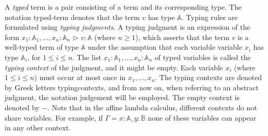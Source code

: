 A \emph{typed} term is a pair consisting of a term and its corresponding type. The notation \gls{typed-term} denotes that the term $v$ has type $\mathbb{A}$. Typing rules are formulated using \emph{typing judgments}. A typing judgment is an expression of the form $x_{1}: \mathbb{A}_{1}, \ldots, x_{n}: \mathbb{A}_{n} \hspace{1pt} \triangleright \hspace{1pt} v: \mathbb{A}$ (where $n \geq 1$), which asserts that the term $v$ is a well-typed term of type $\mathbb{A}$ under the assumption that each variable variable $x_{i}$ has type $\mathbb{A}_{i}$, for $1 \leq i \leq n$. The list $x_{1}: \mathbb{A}_{1}, \ldots, x_{n}: \mathbb{A}_{n}$ of typed variables is called the \emph{typing context} of the judgment, and it might be empty.  Each variable $x_i$ (where $1 \leq i \leq n$) must occur at most once in $x_1, \ldots, x_n$. The typing contexts are denoted by Greek letters \gls{typingcontexts}, and from now on, when referring to an abstract judgment, the notation \gls{judgement} will be employed.
 The empty context is denoted by $-$. Note that in the affine lambda calculus, different contexts do not share variables. For example, if $\Gamma = x:\mathbb{A},y:\mathbb{B}$ none of these variables can appear in any other context. 


